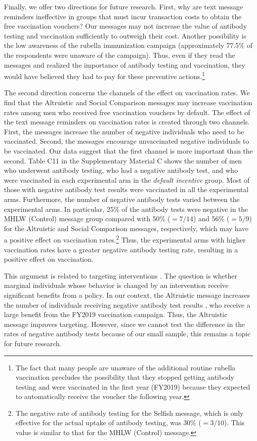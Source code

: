 \documentclass[
  11pt,
  a4paper
]{article}
\begin{document}
Finally, we offer two directions for future research. First, why are text message reminders ineffective in groups that must incur transaction costs to obtain the free vaccination vouchers? Our messages may not increase the value of antibody testing and vaccination sufficiently to outweigh their cost. Another possibility is the low awareness of the rubella immunization campaign (approximately 77.5\% of the respondents were unaware of the campaign). Thus, even if they read the messages and realized the importance of antibody testing and vaccination, they would have believed they had to pay for these preventive actions.\footnote{The fact that many people are unaware of the additional routine rubella vaccination precludes the possibility that they stopped getting antibody testing and were vaccinated in the first year (FY2019) because they expected to automatically receive the voucher the following year.}

The second direction concerns the channels of the effect on vaccination rates. We find that the Altruistic and Social Comparison messages may increase vaccination rates among men who received free vaccination vouchers by default. The effect of the text message reminders on vaccination rates is created through two channels. First, the messages increase the number of negative individuals who need to be vaccinated. Second, the messages encourage unvaccinated negative individuals to be vaccinated. Our data suggest that the first channel is more important than the second. Table C11 in the Supplementary Material C shows the number of men who underwent antibody testing, who had a negative antibody test, and who were vaccinated in each experimental arm in the \emph{default incentive} group. Most of those with negative antibody test results were vaccinated in all the experimental arms. Furthermore, the number of negative antibody tests varied between the experimental arms. In particular, 25\% of the antibody tests were negative in the MHLW (Control) message group compared with 50\% (\(=7/14\)) and 56\% (\(=5/9\)) for the Altruistic and Social Comparison messages, respectively, which may have a positive effect on vaccination rates.\footnote{The negative rate of antibody testing for the Selfish message, which is only effective for the actual uptake of antibody testing, was 30\% (\(=3/10\)). This value is similar to that for the MHLW (Control) message.} Thus, the experimental arms with higher vaccination rates have a greater negative antibody testing rate, resulting in a positive effect on vaccination.

This argument is related to targeting interventions \citep[e.g.,][]{Finkelstein2019}. The question is whether marginal individuals whose behavior is changed by an intervention receive significant benefits from a policy. In our context, the Altruistic message increases the number of individuals receiving negative antibody test results , who receive a large benefit from the FY2019 vaccination campaign. Thus, the Altruistic message improves targeting. However, since we cannot test the difference in the rates of negative antibody tests because of our small sample, this remains a topic for future research.

\clearpage


\end{document}
